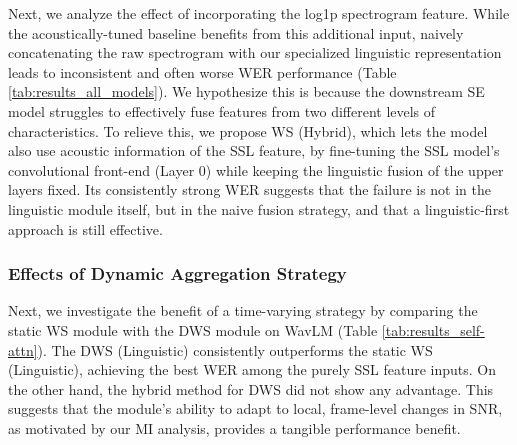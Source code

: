 \documentclass{article}
\begin{document}
Next, we analyze the effect of incorporating the log1p spectrogram feature. While the acoustically-tuned baseline benefits from this additional input, naively concatenating the raw spectrogram with our specialized linguistic representation leads to inconsistent and often worse WER performance (Table \ref{tab:results_all_models}). We hypothesize this is because the downstream SE model struggles to effectively fuse features from two different levels of characteristics. To relieve this, we propose WS (Hybrid), which lets the model also use acoustic information of the SSL feature, by fine-tuning the SSL model's convolutional front-end (Layer 0) while keeping the linguistic fusion of the upper layers fixed. Its consistently strong WER suggests that the failure is not in the linguistic module itself, but in the naive fusion strategy, and that a linguistic-first approach is still effective.


\begin{table}[t]
\centering
\caption{SE performance using the Dynamic Weighted-Sum (DWS) adaptation module on WavLM. 
}
\label{tab:results_self-attn}
\end{table}

\subsubsection{Effects of Dynamic Aggregation Strategy}
Next, we investigate the benefit of a time-varying strategy by comparing the static WS module with the DWS module on WavLM (Table \ref{tab:results_self-attn}). The DWS (Linguistic) consistently outperforms the static WS (Linguistic), achieving the best WER among the purely SSL feature inputs. On the other hand, the hybrid method for DWS did not show any advantage. This suggests that the module's ability to adapt to local, frame-level changes in SNR, as motivated by our MI analysis, provides a tangible performance benefit. 
\end{document}
